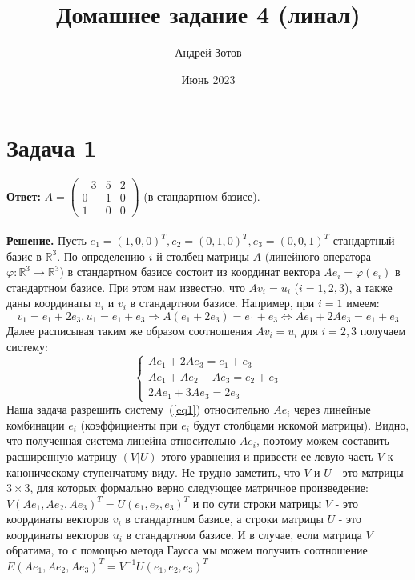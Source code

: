 \documentclass{article}
\title{Домашнее задание 4 (линал)}
\author{Андрей Зотов}
\date{Июнь 2023}
\begin{document}
\maketitle

\section*{Задача 1}
{\bf Ответ:} $A=\left(\begin{array}{rrr}-3 & 5 & 2\\0 & 1 & 0\\1 & 0 & 0\end{array}\right)$ (в стандартном базисе).
\\
\\
{\bf Решение.} Пусть $e_1=(1, 0, 0)^T, e_2=(0, 1, 0)^T, e_3=(0, 0, 1)^T$ стандартный базис в $\mathbb{R}^3$. По определению $i$-й столбец матрицы $A$ (линейного оператора $\varphi: \mathbb{R}^3\rightarrow\mathbb{R}^3$) в стандартном базисе состоит из координат вектора $Ae_i=\varphi(e_i)$ в стандартном базисе. При этом нам известно, что $Av_i=u_i$ ($i=1,2,3$), а также даны координаты $u_i$ и $v_i$ в стандартном базисе. Например, при $i=1$ имеем:
$$v_1=e_1+2e_3, u_1=e_1+e_3\Rightarrow A(e_1+2e_3)=e_1+e_3\Leftrightarrow Ae_1 + 2Ae_3=e_1+e_3$$
Далее расписывая таким же образом соотношения $Av_i=u_i$ для $i=2,3$ получаем систему:
\begin{equation}
\label{eq1}
    \begin{cases}
    Ae_1+2Ae_3 = e_1 + e_3\\
    Ae_1+Ae_2-Ae_3 = e_2 + e_3\\
    2Ae_1+3Ae_3 = 2e_3
    \end{cases}
\end{equation}
Наша задача разрешить систему~(\ref{eq1}) относительно $Ae_i$ через линейные комбинации $e_i$ (коэффициенты при $e_i$ будут столбцами искомой матрицы). Видно, что полученная система линейна относительно $Ae_i$, поэтому можем составить расширенную матрицу $(V|U)$ этого уравнения и привести ее левую часть $V$ к каноническому ступенчатому виду. Не трудно заметить, что $V$ и $U$ - это матрицы $3\times3$, для которых формально верно следующее матричное произведение: $V(Ae_1, Ae_2, Ae_3)^T=U(e_1, e_2, e_3)^T$ и по сути строки матрицы $V$ - это координаты векторов $v_i$ в стандартном базисе, а строки матрицы $U$ - это координаты векторов $u_i$ в стандартном базисе. И в случае, если матрица $V$ обратима, то с помощью метода Гаусса мы можем получить соотношение $E(Ae_1, Ae_2, Ae_3)^T=V^{-1}U(e_1, e_2, e_3)^T$ 
\end{document}
